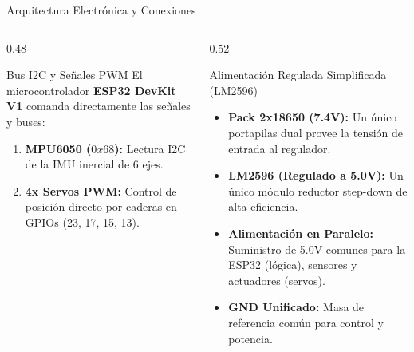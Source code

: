 \documentclass[10pt, aspectratio=169]{beamer}
\begin{document}
\begin{frame}{Arquitectura Electrónica y Conexiones}
    \begin{columns}
        \begin{column}{0.48\textwidth}
            \begin{block}{Bus I2C y Señales PWM}
                El microcontrolador \textbf{ESP32 DevKit V1} comanda directamente las señales y buses:
                \begin{enumerate}
                    \item \textbf{MPU6050 ($0x68$):} Lectura I2C de la IMU inercial de 6 ejes.
                    \item \textbf{4x Servos PWM:} Control de posición directo por caderas en GPIOs (23, 17, 15, 13).
                \end{enumerate}
            \end{block}
        \end{column}
        \begin{column}{0.52\textwidth}
        \begin{alertblock}{Alimentación Regulada Simplificada (LM2596)}
            \begin{itemize}
                \item \textbf{Pack 2x18650 (7.4V):} Un único portapilas dual provee la tensión de entrada al regulador.
                \item \textbf{LM2596 (Regulado a 5.0V):} Un único módulo reductor step-down de alta eficiencia.
                \item \textbf{Alimentación en Paralelo:} Suministro de 5.0V comunes para la ESP32 (lógica), sensores y actuadores (servos).
                \item \textbf{GND Unificado:} Masa de referencia común para control y potencia.
            \end{itemize}
        \end{alertblock}
        \end{column}
    \end{columns}
\end{frame}
\end{document}

